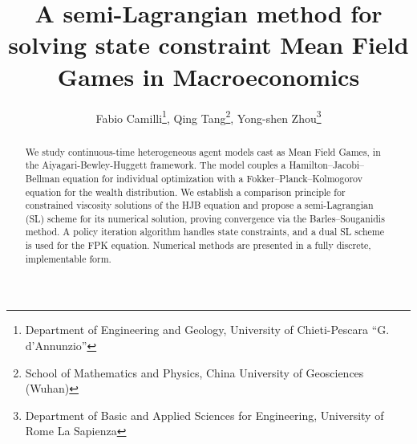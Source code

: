 \documentclass[11pt]{article}
\title{A semi-Lagrangian method for solving state constraint Mean Field Games in Macroeconomics}
\author{Fabio Camilli\thanks{Department of Engineering and Geology, University of  Chieti-Pescara ``G. d'Annunzio''}, Qing Tang\thanks{School of Mathematics and Physics, China University of Geosciences (Wuhan)}, Yong-shen Zhou\thanks{Department of Basic and Applied Sciences for Engineering, University of Rome La Sapienza}}
\date{}
\numberwithin{equation}{section}
\theoremstyle{Claim}
\theoremstyle{plain}
\begin{document}
\maketitle

\begin{abstract} 
We study continuous-time heterogeneous agent models cast as Mean Field Games, in the Aiyagari-Bewley-Huggett framework. The model couples a Hamilton–Jacobi–Bellman   equation for individual optimization with a Fokker–Planck–Kolmogorov   equation for the wealth distribution. We establish a comparison principle for constrained viscosity solutions of the HJB equation and propose a semi-Lagrangian (SL) scheme for its numerical solution, proving convergence via the Barles–Souganidis method. A policy iteration algorithm handles state constraints, and a dual SL scheme is used for the FPK equation. Numerical methods are presented in a fully discrete, implementable form.
\end{abstract}
	
	
\end{document}
